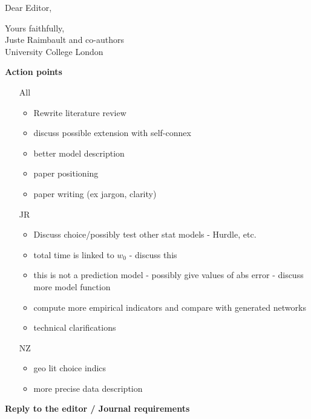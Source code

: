 \documentclass[10pt,a4paper,sans]{moderncv}        %
\begin{document}
\date{\today}
\opening{Dear Editor,}
\closing{Yours faithfully,\\
Juste Raimbault and co-authors\\
University College London
}




\justify


\textbf{Action points}

\begin{itemize}
    \item[All]
    \begin{itemize}
        \item Rewrite literature review
        \item discuss possible extension with self-connex
        \item better model description
        \item paper positioning
        \item paper writing (ex jargon, clarity)
    \end{itemize}
    \item[JR]
    \begin{itemize}
        \item Discuss choice/possibly test other stat models - Hurdle, etc.
        \item total time is linked to $w_0$ - discuss this
        \item this is not a prediction model - possibly give values of abs error - discuss more model function
        \item compute more empirical indicators and compare  with generated networks
        \item technical clarifications
    \end{itemize}
    \item[NZ]
    \begin{itemize}
        \item geo lit choice indics
        \item more precise data description
    \end{itemize}
\end{itemize}






\textbf{Reply to the editor / Journal requirements}

\textit{}
\end{document}
